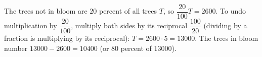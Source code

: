 The trees not in bloom are $20$ percent of all trees $T$, so $\dfrac{20}{100}T=2600$. To undo multiplication by $\dfrac{20}{100}$, multiply both sides by its reciprocal $\dfrac{100}{20}$ (dividing by a fraction is multiplying by its reciprocal): $T=2600\cdot5=13000$. The trees in bloom number $13000-2600=\boxed{10400}$ (or $80$ percent of $13000$).
